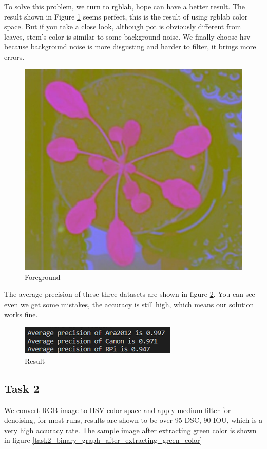 \documentclass[conference]{IEEEtran}
\begin{document}
To solve this problem, we turn to rgblab, hope can have a better result. The result shown in Figure \ref{task1_no_pot} seems perfect, this is the result of using rgblab color space. But if you take a close look, although pot is obviously different from leaves, stem’s color is similar to some background noise. We finally choose hsv because background noise is more disgusting and harder to filter, it brings more errors.

\begin{figure}[h!]
\centering
\includegraphics[width=0.7\linewidth]{img/task1_no_pot.jpg}
\caption{Foreground}
\label{task1_no_pot}
\end{figure}

The average precision of these three datasets are shown in figure \ref{task1_eva}. You can see even we get some mistakes, the accuracy is still high, which means our solution works fine.


\begin{figure}[h!]
\centering
\includegraphics[width=0.7\linewidth]{img/task1_eva.png}
\caption{Result}
\label{task1_eva}
\end{figure}

\subsection{Task 2}
We convert RGB image to HSV color space and apply medium filter for denoising, for most runs, results are shown to be over 95 DSC, 90 IOU, which is a very high accuracy rate. The sample image after extracting green color is shown in figure \ref{task2_binary_graph_after_extracting_green_color}
\end{document}
